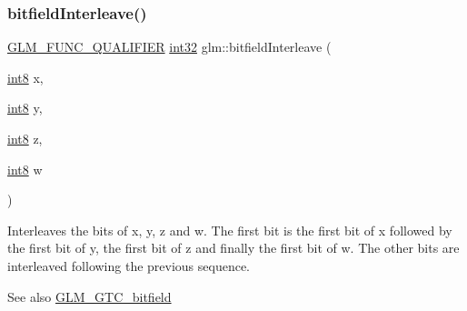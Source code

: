 \subsubsection{\texorpdfstring{bitfield\+Interleave()}{bitfieldInterleave()}\hspace{0.1cm}{\footnotesize\ttfamily [13/16]}}
{\footnotesize\ttfamily \hyperlink{setup_8hpp_a33fdea6f91c5f834105f7415e2a64407}{G\+L\+M\+\_\+\+F\+U\+N\+C\+\_\+\+Q\+U\+A\+L\+I\+F\+I\+ER} \hyperlink{group__gtc__type__precision_ga632d8b25f6b61659f39ea4321fab92a4}{int32} glm\+::bitfield\+Interleave (\begin{DoxyParamCaption}\item[{\hyperlink{group__gtc__type__precision_ga96254f9c1c4506fc8eb5cf3301ce8565}{int8}}]{x,  }\item[{\hyperlink{group__gtc__type__precision_ga96254f9c1c4506fc8eb5cf3301ce8565}{int8}}]{y,  }\item[{\hyperlink{group__gtc__type__precision_ga96254f9c1c4506fc8eb5cf3301ce8565}{int8}}]{z,  }\item[{\hyperlink{group__gtc__type__precision_ga96254f9c1c4506fc8eb5cf3301ce8565}{int8}}]{w }\end{DoxyParamCaption})}

Interleaves the bits of x, y, z and w. The first bit is the first bit of x followed by the first bit of y, the first bit of z and finally the first bit of w. The other bits are interleaved following the previous sequence.

\begin{DoxySeeAlso}{See also}
\hyperlink{group__gtc__bitfield}{G\+L\+M\+\_\+\+G\+T\+C\+\_\+bitfield} 
\end{DoxySeeAlso}
\mbox{\label{group__gtc__bitfield_ga447c0bbed9d60c14578626d8f03f3755}} 
